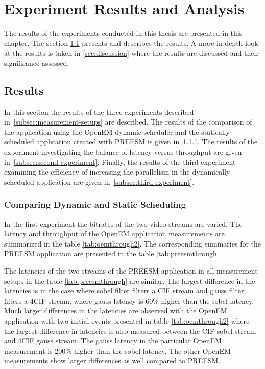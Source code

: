 \chapter{Experiment Results and Analysis}
\label{chapter:results-and-analysis}
The results of the experiments conducted in this thesis are presented in this chapter. The section \ref{sec:results} presents and describes the results. A more in-depth look at the results is taken in \ref{sec:discussion} where the results are discussed and their significance assessed.

\section{Results}
\label{sec:results}
In this section the results of the three experiments described in~\ref{subsec:measurement-setups} are described. The results of the comparison of the application using the OpenEM dynamic scheduler and the statically scheduled application created with PREESM is given in~\ref{subsec:first-experiment}. The results of the experiment investigating the balance of latency versus throughput are given in~\ref{subsec:second-experiment}. Finally, the results of the third experiment examining the efficiency of increasing the parallelism in the dynamically scheduled application are given in~\ref{subsec:third-experiment}.

\subsection{Comparing Dynamic and Static Scheduling}
\label{subsec:first-experiment}
\FloatBarrier
In the first experiment the bitrates of the two video streams are varied. The latency and throughput of the OpenEM application measurements are summarized in the table \ref{tab:oemthrough2}. The corresponding summaries for the PREESM application are presented in the table \ref{tab:preesmthrough} 

The latencies of the two streams of the PREESM application in all measurement setups in the table \ref{tab:preesmthrough} are similar. The largest difference in the latencies is in the case where sobel filter filters a CIF stream and gauss filter filters a 4CIF stream, where gauss latency is 60\% higher than the sobel latency. Much larger differences in the latencies are observed with the OpenEM application with two initial events presented in table \ref{tab:oemthrough2} where the largest difference in latencies is also measured between the CIF sobel stream and 4CIF gauss stream. The gauss latency in the particular OpenEM measurement is 200\% higher than the sobel latency. The other OpenEM measurements show larger differences as well compared to PREESM.

